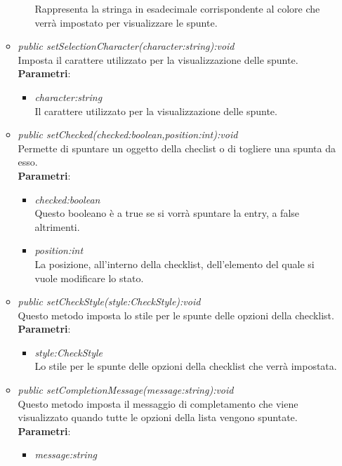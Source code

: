 \begin{itemize}
\begin{itemize}
\begin{itemize}
		Rappresenta la stringa in esadecimale corrispondente al colore che verrà impostato per visualizzare le spunte.
		\end{itemize}  
	\item \textit{public setSelectionCharacter(character:string):void}\\
	Imposta il carattere utilizzato per la visualizzazione delle spunte.
		\\ \textbf{Parametri}: \begin{itemize}
		\item \textit{character:string}\\
		Il carattere utilizzato per la visualizzazione delle spunte.
		\end{itemize} 
	\item \textit{public setChecked(checked:boolean,position:int):void}\\
	Permette di spuntare un oggetto della checlist o di togliere una spunta da esso.
		\\ \textbf{Parametri}: \begin{itemize}
		\item \textit{checked:boolean}\\
		Questo booleano è a true se si vorrà spuntare la entry, a false altrimenti.
		\item \textit{position:int}\\
		La posizione, all'interno della checklist, dell'elemento del quale si vuole modificare lo stato. 
		\end{itemize}  
	\item \textit{public setCheckStyle(style:CheckStyle):void}\\
	Questo metodo imposta lo stile per le spunte delle opzioni della checklist.
		\\ \textbf{Parametri}: \begin{itemize}
		\item \textit{style:CheckStyle}\\
		Lo stile per le spunte delle opzioni della checklist che verrà impostata.
		\end{itemize}  
	\item \textit{public setCompletionMessage(message:string):void}\\
	Questo metodo imposta il messaggio di completamento che viene visualizzato quando tutte le opzioni della lista vengono spuntate.
		\\ \textbf{Parametri}: \begin{itemize}
		\item \textit{message:string}\\

\end{itemize}
\end{itemize}
\end{itemize}
